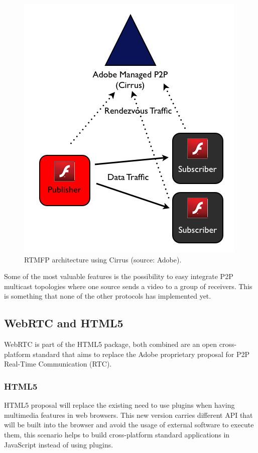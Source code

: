  \begin{figure}[h]
  \centering
    \includegraphics[scale=0.6]{./figures/cirrusAdobe.jpg}
      \caption[RTMFP architecture using Cirrus (source: Adobe)]{RTMFP architecture using Cirrus (source: Adobe).}
	\label{fig:RTMFParchitecture}
\end{figure}
 
Some of the most valuable features is the possibility to easy integrate P2P multicast topologies where one source sends a video to a group of receivers. This is something that none of the other protocols has implemented yet.

\subsection{WebRTC and HTML5}

WebRTC is part of the HTML5 package, both combined are an open cross-platform standard that aims to replace the Adobe proprietary proposal for P2P Real-Time Communication (RTC).

\subsubsection{HTML5}

HTML5 proposal will replace the existing need to use plugins when having multimedia features in web browsers. This new version carries different API that will be built into the browser and avoid the usage of external software to execute them, this scenario helps to build cross-platform standard applications in JavaScript instead of using plugins. 


